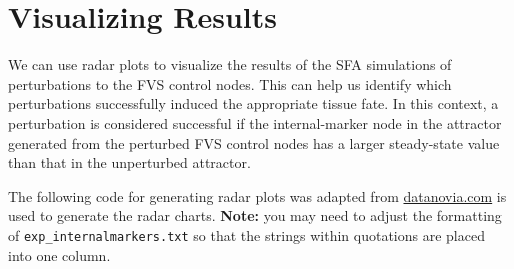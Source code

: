 \documentclass[
]{book}
\newenvironment{Shaded}{\begin{snugshade}}{\end{snugshade}}
\newcommand{\CommentTok}[1]{\textcolor[rgb]{0.56,0.35,0.01}{\textit{#1}}}
\newcommand{\ControlFlowTok}[1]{\textcolor[rgb]{0.13,0.29,0.53}{\textbf{#1}}}
\newcommand{\DataTypeTok}[1]{\textcolor[rgb]{0.13,0.29,0.53}{#1}}
\newcommand{\DecValTok}[1]{\textcolor[rgb]{0.00,0.00,0.81}{#1}}
\newcommand{\FloatTok}[1]{\textcolor[rgb]{0.00,0.00,0.81}{#1}}
\newcommand{\KeywordTok}[1]{\textcolor[rgb]{0.13,0.29,0.53}{\textbf{#1}}}
\newcommand{\NormalTok}[1]{#1}
\newcommand{\OperatorTok}[1]{\textcolor[rgb]{0.81,0.36,0.00}{\textbf{#1}}}
\newcommand{\OtherTok}[1]{\textcolor[rgb]{0.56,0.35,0.01}{#1}}
\newcommand{\StringTok}[1]{\textcolor[rgb]{0.31,0.60,0.02}{#1}}
\theoremstyle{definition}
\theoremstyle{definition}
\theoremstyle{definition}
\theoremstyle{definition}
\theoremstyle{remark}
\begin{document}
\hypertarget{visualizing-results}{%
\section{Visualizing Results}\label{visualizing-results}}

We can use radar plots to visualize the results of the SFA simulations of perturbations to the FVS control nodes. This can help us identify which perturbations successfully induced the appropriate tissue fate. In this context, a perturbation is considered successful if the internal-marker node in the attractor generated from the perturbed FVS control nodes has a larger steady-state value than that in the unperturbed attractor.

The following code for generating radar plots was adapted from \href{https://www.google.com/search?q=create+_beautiful_+radar+chart\&oq=create+beautiful+rada\&aqs=chrome.1.69i57j0i10i22i30.11973j0j1\&sourceid=chrome\&ie=UTF-8}{datanovia.com} is used to generate the radar charts.
\textbf{Note: } you may need to adjust the formatting of \texttt{exp\_internalmarkers.txt} so that the strings within quotations are placed into one column.

\begin{Shaded}
\end{Shaded}
\end{document}
